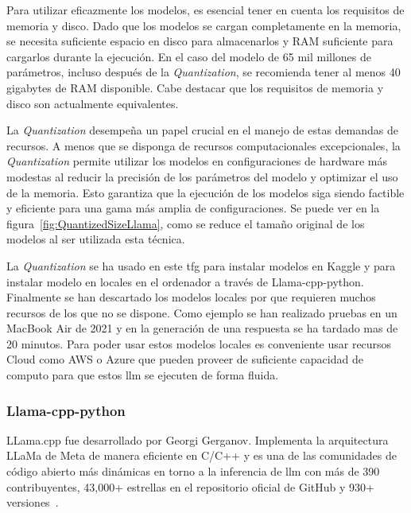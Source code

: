 Para utilizar eficazmente los modelos, es esencial tener en cuenta los requisitos de memoria y disco. Dado que los modelos se cargan completamente en la memoria, se necesita suficiente espacio en disco para almacenarlos y RAM suficiente para cargarlos durante la ejecución. En el caso del modelo de 65 mil millones de parámetros, incluso después de la \textit{Quantization}, se recomienda tener al menos 40 gigabytes de RAM disponible. Cabe destacar que los requisitos de memoria y disco son actualmente equivalentes.


La \textit{Quantization} desempeña un papel crucial en el manejo de estas demandas de recursos. A menos que se disponga de recursos computacionales excepcionales, la \textit{Quantization} permite utilizar los modelos en configuraciones de hardware más modestas al reducir la precisión de los parámetros del modelo y optimizar el uso de la memoria. Esto garantiza que la ejecución de los modelos siga siendo factible y eficiente para una gama más amplia de configuraciones. Se puede ver en la figura~\ref{fig:QuantizedSizeLlama}, como se reduce el tamaño original de los modelos al ser utilizada esta técnica.

La \textit{Quantization} se ha usado en este \acrshort{tfg} para instalar modelos en Kaggle y para instalar modelo en locales en el ordenador a través de Llama-cpp-python. Finalmente se han descartado los modelos locales por que requieren muchos recursos de los que no se dispone. Como ejemplo se han realizado pruebas en un MacBook Air de 2021 y en la generación de una respuesta se ha tardado mas de 20 minutos. Para poder usar estos modelos locales es conveniente usar recursos Cloud como AWS o Azure que pueden proveer de suficiente capacidad de computo para que estos \acrshort{llm} se ejecuten de forma fluida. 

\subsubsection{Llama-cpp-python}

LLama.cpp fue desarrollado por Georgi Gerganov. Implementa la arquitectura LLaMa de Meta de manera eficiente en C/C++ y es una de las comunidades de código abierto más dinámicas en torno a la inferencia de \acrlong{llm} con más de 390 contribuyentes, 43,000+ estrellas en el repositorio oficial de GitHub y 930+ versiones~\cite{llama.cpp}.


